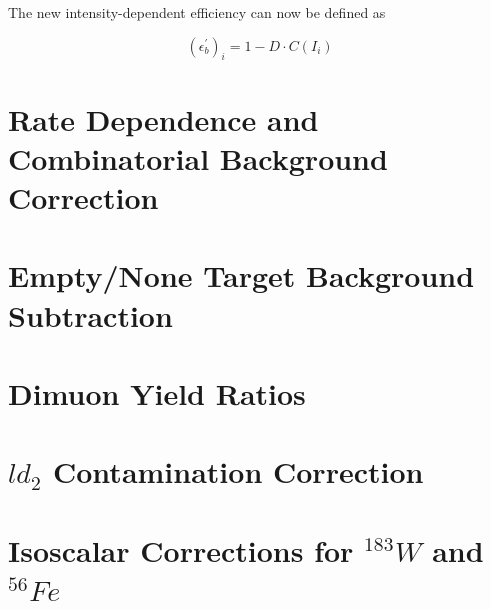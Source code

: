 The new intensity-dependent efficiency can now be defined as

\begin{equation}
(\epsilon_b^\prime)_i = 1 - D \cdot C(I_i)
\end{equation}

\section{Rate Dependence and Combinatorial Background Correction}



\section{Empty/None Target Background Subtraction}



\section{Dimuon Yield Ratios}



\section{$ld_2$ Contamination Correction}



\section{Isoscalar Corrections for $^{183}W$ and $^{56}Fe$}


